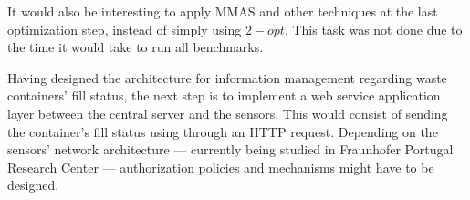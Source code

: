 It would also be interesting to apply MMAS and other techniques at the last
optimization step, instead of simply using $2-opt$. This task was not done due
to the time it would take to run all benchmarks.

Having designed the architecture for information management regarding waste
containers' fill status, the next step is to implement a web service
application layer between the central server and the sensors. This would
consist of sending the container's fill status using through an HTTP request.
Depending on the sensors' network architecture --- currently being studied in
Fraunhofer Portugal Research Center --- authorization policies and mechanisms
might have to be designed.


